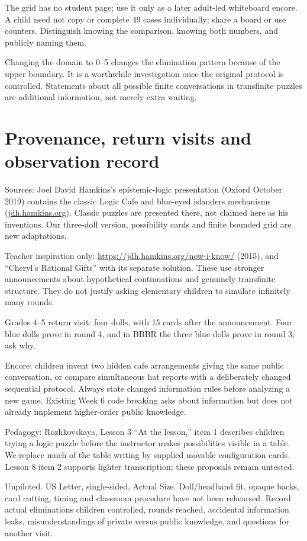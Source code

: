 \documentclass[11pt,letterpaper]{article}
\begin{document}
The grid has no student page; use it only as a later adult-led whiteboard encore. A child need not copy or complete 49 cases individually; share a board or use counters. Distinguish knowing the comparison, knowing both numbers, and publicly naming them.

Changing the domain to 0--5 changes the elimination pattern because of the upper boundary. It is a worthwhile investigation once the original protocol is controlled. Statements about all possible finite conversations in transfinite puzzles are additional information, not merely extra waiting.
\newpage
\section*{Provenance, return visits and observation record}
Sources: Joel David Hamkins's epistemic-logic presentation (Oxford October 2019) contains the classic Logic Cafe and blue-eyed islanders mechanisms (\href{https://jdh.hamkins.org/i-know-that-you-know-that-i-know-that-you-know-oxford-october-2019/}{jdh.hamkins.org}). Classic puzzles are presented there, not claimed here as his inventions. Our three-doll version, possibility cards and finite bounded grid are new adaptations.

Teacher inspiration only: \url{https://jdh.hamkins.org/now-i-know/} (2015), and ``Cheryl's Rational Gifts'' with its separate solution. These use stronger announcements about hypothetical continuations and genuinely transfinite structure. They do not justify asking elementary children to simulate infinitely many rounds.

Grades 4--5 return visit: four dolls, with 15 cards after the announcement. Four blue dolls prove in round 4, and in BBBR the three blue dolls prove in round 3; ask why.

Encore: children invent two hidden cafe arrangements giving the same public conversation, or compare simultaneous hat reports with a deliberately changed sequential protocol. Always state changed information rules before analyzing a new game. Existing Week 6 code breaking asks about information but does not already implement higher-order public knowledge.

Pedagogy: Rozhkovskaya, Lesson 3 ``At the lesson,'' item 1 describes children trying a logic puzzle before the instructor makes possibilities visible in a table. We replace much of the table writing by supplied movable configuration cards. Lesson 8 item 2 supports lighter transcription; these proposals remain untested.

Unpiloted. US Letter, single-sided, Actual Size. Doll/headband fit, opaque backs, card cutting, timing and classroom procedure have not been rehearsed. Record actual eliminations children controlled, rounds reached, accidental information leaks, misunderstandings of private versus public knowledge, and questions for another visit.
\end{document}
